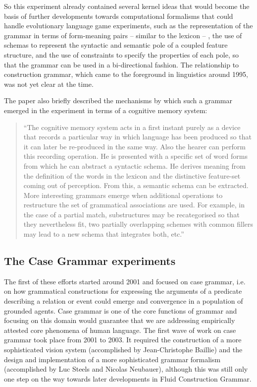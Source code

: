 So this experiment already contained several kernel ideas that would become the basis of further developments towards
computational formalisms that could handle evolutionary language game experiments, such as the 
representation of the grammar in terms of form-meaning pairs -- similar to the lexicon -- ,  
the use of schemas to represent the syntactic and semantic pole of a coupled feature structure, and the use of constraints to specify the 
properties of each pole, so that the grammar can be used in a bi-directional fashion. 
The relationship to construction grammar, which came to the foreground in linguistics 
around 1995, was not yet clear at the time. 

The paper also briefly described the mechanisms by which such a grammar emerged in the experiment in terms of a 
cognitive memory system: 

\begin{quotation}
``The cognitive memory system acts in a first instant purely as a device that records 
a particular way in which language has been produced so that it can later be re-produced in the same way.
Also the hearer can perform this recording operation. He is presented with a specific set of word forms from which he can abstract a syntactic schema. He derives meaning from the definition of the words in the lexicon and the distinctive feature-set coming out of perception. From this, a semantic schema can be extracted.
More interesting grammars emerge when additional operations to restructure the set of grammatical associations are used. For example, in the case of a partial match, substructures may be recategorised so that they nevertheless fit, two partially overlapping schemes with common fillers may lead to a new schema that integrates both, etc.''
\end{quotation}


\subsection{The Case Grammar experiments}

The first of these efforts started around 2001 and focused on case grammar, i.e. on 
how grammatical constructions for expressing the arguments of a predicate describing a relation or
event could emerge and convergence in 
a population of grounded agents. Case grammar is one of the core functions of grammar and focusing on this domain would 
guarantee that we are addressing empirically attested core phenomena of human language. The first wave of work on case grammar
took place from 2001 to 2003. 
It required the construction of a more sophisticated vision system (accomplished by Jean-Christophe Baillie) and the 
design and implementation of a more sophisticated grammar formalism (accomplished by Luc Steels and Nicolas Neubauer), 
although this was still only one step on the way towards later developments in Fluid Construction Grammar. 


